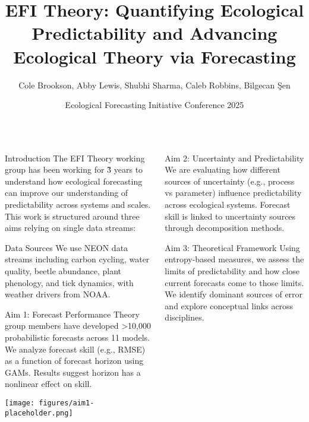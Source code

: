 \documentclass[final]{beamer}
\title{EFI Theory: Quantifying Ecological Predictability and Advancing Ecological Theory via Forecasting}
\author{Cole Brookson, Abby Lewis, Shubhi Sharma, Caleb Robbins, Bilgecan \c{S}en}
\date{Ecological Forecasting Initiative Conference 2025}
\begin{document}
\begin{frame}[t]

\begin{columns}[t,totalwidth=0.99\textwidth]

\begin{column}{0.32\textwidth}
  \begin{block}{Introduction}
    The EFI Theory working group has been working for \~3 years to understand how ecological forecasting can improve our understanding of predictability across systems and scales. This work is structured around three aims relying on single data streams:
  \end{block}

  \begin{block}{Data Sources}
    We use NEON data streams including carbon cycling, water quality, beetle abundance, plant phenology, and tick dynamics, with weather drivers from NOAA.
  \end{block}

  \begin{block}{Aim 1: Forecast Performance}
    Theory group members have developed >10,000 probabilistic forecasts across 11 models. We analyze forecast skill (e.g., RMSE) as a function of forecast horizon using GAMs. Results suggest horizon has a nonlinear effect on skill.

    \vspace{1em}
    \texttt{[image: figures/aim1-placeholder.png]} %
  \end{block}
\end{column}

\begin{column}{0.32\textwidth}
  \begin{block}{Aim 2: Uncertainty and Predictability}
    We are evaluating how different sources of uncertainty (e.g., process vs parameter) influence predictability across ecological systems. Forecast skill is linked to uncertainty sources through decomposition methods.
  \end{block}

  \begin{block}{Aim 3: Theoretical Framework}
    Using entropy-based measures, we assess the limits of predictability and how close current forecasts come to those limits. We identify dominant sources of error and explore conceptual links across disciplines.


\end{block}
\end{column}
\end{columns}
\end{frame}
\end{document}
